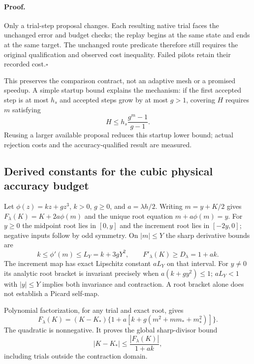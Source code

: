 \paragraph{Proof.}
Only a trial-step proposal changes. Each resulting native trial faces the
unchanged error and budget checks; the replay begins at the same state and
ends at the same target. The unchanged route predicate therefore still
requires the original qualification and observed cost inequality. Failed
pilots retain their recorded cost.\hfill$\square$

This preserves the comparison contract, not an adaptive mesh or a promised
speedup. A simple startup bound explains the mechanism: if the first accepted
step is at most $h_s$ and accepted steps grow by at most $g>1$, covering $H$
requires $m$ satisfying
\begin{equation}
 H\le h_s\frac{g^m-1}{g-1}.
\end{equation}
Reusing a larger available proposal reduces this startup lower bound;
actual rejection costs and the accuracy-qualified result are measured.

\subsection{Derived constants for the cubic physical accuracy budget}

Let $\phi(z)=kz+gz^3$, $k>0$, $g\ge0$, and $a=\lambda h/2$.
Writing $m=y+K/2$ gives $F_\lambda(K)=K+2a\phi(m)$ and the unique
root equation $m+a\phi(m)=y$. For $y\ge0$ the midpoint root lies in
$[0,y]$ and the increment root lies in $[-2y,0]$; negative inputs follow
by odd symmetry. On $|m|\le Y$ the sharp derivative bounds are
\begin{equation}
 k\le\phi'(m)\le L_Y=k+3gY^2,
 \qquad F'_\lambda(K)\ge D_\lambda=1+ak.
\end{equation}
The increment map has exact Lipschitz constant $aL_Y$ on that interval.
For $y\ne0$ its analytic root bracket is invariant precisely when
$a(k+gy^2)\le1$; $aL_Y<1$ with $|y|\le Y$ implies both invariance and
contraction. A root bracket alone does not establish a Picard self-map.

Polynomial factorization, for any trial and exact root, gives
\begin{equation}
 F_\lambda(K)=(K-K_*)
 \{1+a[k+g(m^2+mm_*+m_*^2)]\}.
\end{equation}
The quadratic is nonnegative. It proves the global sharp-divisor bound
\begin{equation}
 |K-K_*|\le \frac{|F_\lambda(K)|}{1+ak},
\end{equation}
including trials outside the contraction domain.

